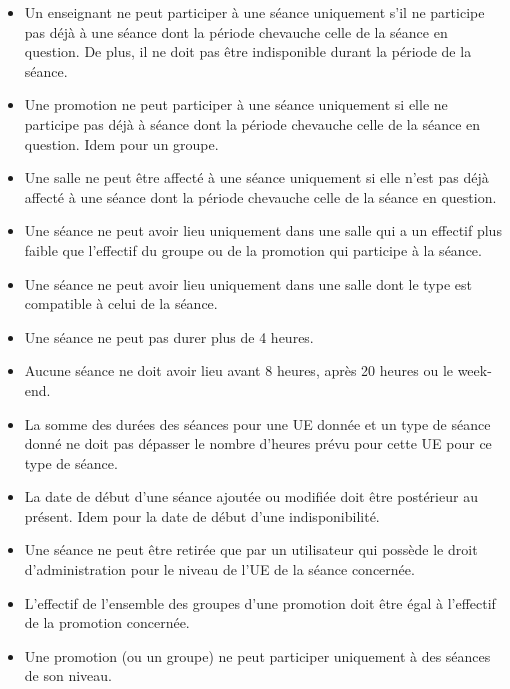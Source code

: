 \documentclass{article}
\begin{document}
\begin{itemize}
\item Un enseignant ne peut participer à une séance uniquement s'il ne participe pas déjà à une séance dont la période chevauche celle de la séance en question. De plus, il ne doit pas être indisponible durant la période de la séance.

\item Une promotion ne peut participer à une séance uniquement si elle ne participe pas déjà à séance dont la période chevauche celle de la séance en question. Idem pour un groupe.

\item Une salle ne peut être affecté à une séance uniquement si elle n'est pas déjà affecté à une séance dont la période chevauche celle de la séance en question.

\item Une séance ne peut avoir lieu uniquement dans une salle qui a un effectif plus faible que l'effectif du groupe ou de la promotion qui participe à la séance.

\item Une séance ne peut avoir lieu uniquement dans une salle dont le type est compatible à celui de la séance.

\item Une séance ne peut pas durer plus de 4 heures.

\item Aucune séance ne doit avoir lieu avant 8 heures, après 20 heures ou le week-end.

\item La somme des durées des séances pour une UE donnée et un type de séance donné ne doit pas dépasser le nombre d'heures prévu pour cette UE pour ce type de séance.

\item La date de début d'une séance ajoutée ou modifiée doit être postérieur au présent. Idem pour la date de début d'une indisponibilité.

\item Une séance ne peut être retirée que par un utilisateur qui possède le droit d'administration pour le niveau de l'UE de la séance concernée.

\item L'effectif de l'ensemble des groupes d'une promotion doit être égal à l'effectif de la promotion concernée.

\item Une promotion (ou un groupe) ne peut participer uniquement à des séances de son niveau.


\end{itemize}
\end{document}
